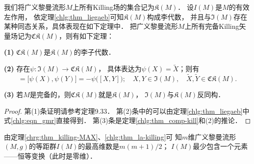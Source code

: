 我们将广义黎曼流形$M$上所有Killing场的集合记为$\mathfrak{K}(M)$．
设$I(M)$是$M$的有效左作用，
依定理\ref{chlg:thm_liegaeb}可知$\mathfrak{K}(M)$构成李代数，
并且与$\mathfrak{I}(M)$存在某种同态关系，具体表现在如下定理中．
把广义黎曼流形$M$上所有{\kaishu 完备}Killing矢量场记为$\mathfrak{CK}(M)$，则有如下定理：
\begin{theorem}\label{chlg:thm_la-killing}
    {\bfseries (1)} $\mathfrak{CK}(M)$是$\mathfrak{K}(M)$的李子代数．
    
    {\bfseries (2)} 存在$\psi:\mathfrak{I}(M) \to \mathfrak{CK}(M)$，
    具体表达为$\psi(X)=\widetilde{X}$；则有
    \begin{equation*}
        [\widetilde{X},\widetilde{Y}]=\bigl[\psi(X),\psi(Y)\bigr]=-\psi\bigl([X,Y]\bigr);
        \quad X,Y\in\mathfrak{I}(M), \quad  
        \widetilde{X},\widetilde{Y} \in \mathfrak{CK}(M).
    \end{equation*}
    
    {\bfseries (3)} 若$M$是完备的，则$\mathfrak{CK}(M)$就是$\mathfrak{K}(M)$，
    $\mathfrak{I}(M)$与$\mathfrak{K}(M)$反同构．
\end{theorem}
\begin{proof}
    第(1)条证明请参考\parencite{oneill1983}定理9.33．
    第(2)条中的可以由定理\ref{chlg:thm_liegaeb}中式\eqref{chlg:eqn_gmr}直接得到．
    第(3)条是定理\ref{chlg:thm_comp-kill}和(2)的推论．
\end{proof}

\begin{remark}
	由定理\ref{chrg:thm_killing-MAX}、\ref{chlg:thm_la-killing}可
	知$m$维广义黎曼流形$(M,g)$的等距群$I(M)$的最高维数是$m(m+1)/2$；
	$I(M)$最少包含一个元素——恒等变换（此时是零维）．
\end{remark}







